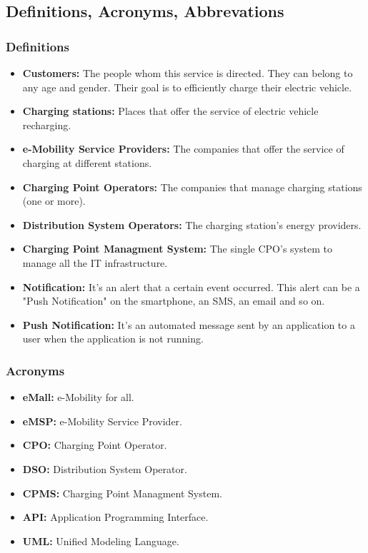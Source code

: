 \subsection{Definitions, Acronyms, Abbrevations}
\subsubsection{Definitions}
\begin{itemize}
        \item \textbf{Customers:} The people whom this service is directed. 
        They can belong to any age and gender. \label{Customer}
        Their goal is to efficiently charge their electric vehicle.        
        \item \textbf{Charging stations:} Places that offer the service of electric vehicle recharging.
        \item \textbf{e-Mobility Service Providers:} The companies that offer the service of charging at different stations.
        \item \textbf{Charging Point Operators:} The companies that manage charging stations (one or more).\label{CPO}
        \item \textbf{Distribution System Operators:} The charging station's energy providers.\label{DSO}
        \item \textbf{Charging Point Managment System:} The single CPO's system to manage all the IT infrastructure.
        \item \textbf{Notification:} It's an alert that a certain event occurred. 
        This alert can be a "Push Notification" on the smartphone, an SMS, an email and so on.
        \item \textbf{Push Notification:} It's an automated message sent by an application to a user when the application is not running.
\end{itemize}
\subsubsection{Acronyms}
\begin{itemize}
        \item \textbf{eMall:} e-Mobility for all.
        \item \textbf{eMSP:} e-Mobility Service Provider.
        \item \textbf{CPO:} Charging Point Operator.
        \item \textbf{DSO:} Distribution System Operator.
        \item \textbf{CPMS:} Charging Point Managment System.
        \item \textbf{API:} Application Programming Interface.
        \item \textbf{UML:} Unified Modeling Language.
\end{itemize}
